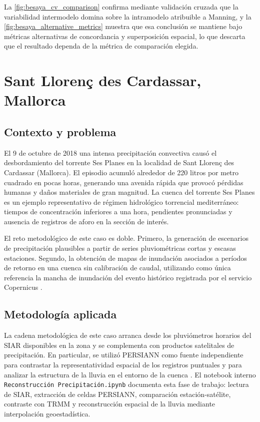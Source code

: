 La \cref{fig:besaya_cv_comparison} confirma mediante validación cruzada que la variabilidad intermodelo domina sobre la intramodelo atribuible a Manning, y la \cref{fig:besaya_alternative_metrics} muestra que esa conclusión se mantiene bajo métricas alternativas de concordancia y superposición espacial, lo que descarta que el resultado dependa de la métrica de comparación elegida.

\clearpage
\section{Sant Llorenç des Cardassar, Mallorca}
\label{sec:caso_mallorca}

\subsection{Contexto y problema}

El 9 de octubre de 2018 una intensa precipitación convectiva causó el desbordamiento del torrente Ses Planes en la localidad de Sant Llorenç des Cardassar (Mallorca). El episodio acumuló alrededor de 220 litros por metro cuadrado en pocas horas, generando una avenida rápida que provocó pérdidas humanas y daños materiales de gran magnitud. La cuenca del torrente Ses Planes es un ejemplo representativo de régimen hidrológico torrencial mediterráneo: tiempos de concentración inferiores a una hora, pendientes pronunciadas y ausencia de registros de aforo en la sección de interés.

El reto metodológico de este caso es doble. Primero, la generación de escenarios de precipitación plausibles a partir de series pluviométricas cortas y escasas estaciones. Segundo, la obtención de mapas de inundación asociados a períodos de retorno en una cuenca sin calibración de caudal, utilizando como única referencia la mancha de inundación del evento histórico registrada por el servicio Copernicus \parencite{navas2019mallorca}.

\subsection{Metodología aplicada}

La cadena metodológica de este caso arranca desde los pluviómetros horarios del SIAR disponibles en la zona y se complementa con productos satelitales de precipitación. En particular, se utilizó PERSIANN como fuente independiente para contrastar la representatividad espacial de los registros puntuales y para analizar la estructura de la lluvia en el entorno de la cuenca \parencite{ashouri2015persiann}. El notebook interno \texttt{Reconstrucción Precipitación.ipynb} documenta esta fase de trabajo: lectura de SIAR, extracción de celdas PERSIANN, comparación estación-satélite, contraste con TRMM y reconstrucción espacial de la lluvia mediante interpolación geoestadística.


